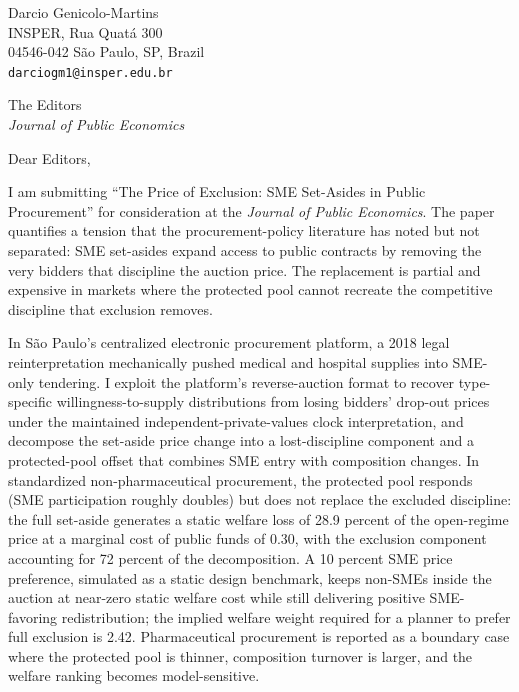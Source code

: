 \documentclass[11pt]{article}
\begin{document}
\begin{flushright}
\small
Darcio Genicolo-Martins\\
INSPER, Rua Quat\'a 300\\
04546-042 S\~ao Paulo, SP, Brazil\\
\texttt{darciogm1@insper.edu.br}
\end{flushright}

\bigskip

\noindent The Editors\\
\textit{Journal of Public Economics}

\medskip

\noindent Dear Editors,

I am submitting ``The Price of Exclusion: SME Set-Asides in Public
Procurement'' for consideration at the \emph{Journal of Public Economics}.
The paper quantifies a tension that the procurement-policy literature has
noted but not separated: SME set-asides expand access to public contracts
by removing the very bidders that discipline the auction price. The
replacement is partial and expensive in markets where the protected pool
cannot recreate the competitive discipline that exclusion removes.

In S\~ao Paulo's centralized electronic procurement platform, a 2018
legal reinterpretation mechanically pushed medical and hospital supplies
into SME-only tendering. I exploit the platform's reverse-auction format
to recover type-specific willingness-to-supply distributions from losing
bidders' drop-out prices under the maintained independent-private-values
clock interpretation, and decompose the set-aside price change into a
lost-discipline component and a protected-pool offset that combines SME
entry with composition changes. In standardized non-pharmaceutical
procurement, the protected pool responds (SME participation roughly
doubles) but does not replace the excluded discipline: the full set-aside
generates a static welfare loss of 28.9 percent of the open-regime price
at a marginal cost of public funds of 0.30, with the exclusion component
accounting for 72 percent of the decomposition. A 10 percent SME price
preference, simulated as a static design benchmark, keeps non-SMEs inside
the auction at near-zero static welfare cost while still delivering
positive SME-favoring redistribution; the implied welfare weight required
for a planner to prefer full exclusion is 2.42. Pharmaceutical
procurement is reported as a boundary case where the protected pool is
thinner, composition turnover is larger, and the welfare ranking becomes
model-sensitive.
\end{document}
